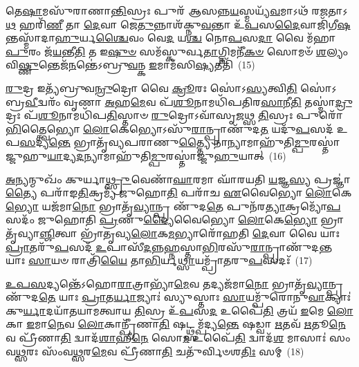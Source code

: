 {\anuvakamend[{𑌯𑍋 𑌵𑌾 𑌓𑌜᳴ 𑌆\-\ul{𑌹} 𑌯𑌦᳴\-\ul{𑌶𑍀}\-𑌯𑍇\-\ul{𑌤𑌿} 𑌤𑍇॑\-𑌽\-\ul{𑌗𑍍𑌨} 𑌏𑌕𑌾᳴\-𑌦𑌶 𑌚}]}%

𑌤𑍇\-\ul{𑌷𑌾}\-𑌮𑌸𑍁᳴𑌰𑌾𑌣𑌾\-\ul{𑌨𑍍𑌤𑌿}\-𑌸𑍍𑌰𑌃 𑌪𑍁𑌰᳴ 𑌆𑌸𑌨𑍍𑌨\-\ul{𑌯}\-𑌸𑍍𑌮𑌯𑍍𑌯᳴\-\ul{𑌵}\-𑌮𑌾\-𑌽𑌥᳴ 𑌰\-\ul{𑌜}\-𑌤𑌾\-𑌽\-\ul{𑌥} 𑌹𑌰𑌿᳴\-\ul{𑌣𑍀} 𑌤𑌾 \ul{𑌦𑍇}\-𑌵𑌾 𑌜𑍇\-\ul{𑌤𑍁}\-𑌨𑍍𑌨𑌾𑌶᳴𑌕𑍍𑌨𑍁\-\ul{𑌵}\-𑌨𑍍𑌤𑌾 𑌉᳴\-\ul{𑌪}\-𑌸\-\ul{𑌦𑍈}\-𑌵𑌾𑌜𑌿᳴𑌗𑍀\-\ul{𑌷}\-𑌨𑍍𑌤𑌸𑍍𑌮𑌾᳴𑌦𑌾\-\ul{𑌹𑍁}\-𑌰𑍍𑌯\-\ul{𑌶𑍍𑌚𑍈}\-𑌵𑌂 𑌵𑍇\-\ul{𑌦} 𑌯\-\ul{𑌶𑍍𑌚} 𑌨𑍋\-\ul{𑌪}\-𑌸\-\ul{𑌦𑌾} 𑌵𑍈 𑌮᳴𑌹𑌾\-\ul{𑌪𑍁}\-𑌰𑌂 𑌜᳴\-\ul{𑌯}\-𑌨𑍍𑌤𑍀\-\ul{𑌤𑌿} 𑌤 𑌇\-\ul{𑌷𑍁}\-\-\ul{𑍞} 𑌸𑌮᳴𑌸𑍍𑌕𑍁𑌰𑍍𑌵\-\ul{𑌤𑌾}\-𑌗𑍍𑌨𑌿𑌮𑌨𑍀᳴\-\ul{𑌕}\-\-\ul{𑍞} 𑌸𑍋𑌮𑍞᳴ \ul{𑌶}\-𑌲𑍍𑌯𑌂 𑌵𑌿\-\ul{𑌷𑍍𑌣𑍁}\-𑌨𑍍𑌤𑍇𑌜᳴\-\ul{𑌨}\-𑌨𑍍𑌤𑍇॑\-𑌽𑌬𑍍𑌰𑍁\-\ul{𑌵}\-𑌨𑍍𑌕 \ul{𑌇}\-𑌮𑌾𑌮᳴𑌸𑌿\-\ul{𑌷𑍍𑌯}\-𑌤𑍀𑌤𑌿᳴~(15)

\-\ul{𑌰𑍁}\-𑌦𑍍𑌰 𑌇𑌤𑍍𑌯᳴𑌬𑍍𑌰𑍁𑌵\-\ul{𑌨𑍍𑌰𑍁}\-𑌦𑍍𑌰𑍋 𑌵𑍈 \ul{𑌕𑍍𑌰𑍂}\-𑌰𑌃 𑌸𑍋॑\-𑌽\-\ul{𑌸𑍍𑌯}\-𑌤𑍍𑌵𑌿\-\ul{𑌤𑌿} 𑌸𑍋॑\-𑌽𑌬𑍍𑌰\-\ul{𑌵𑍀}\-𑌦𑍍𑌵𑌰𑌂᳴ 𑌵𑍃𑌣𑌾 \ul{𑌅}\-𑌹\-\ul{𑌮𑍇}\-𑌵 𑌪᳴\-\ul{𑌶𑍂}\-𑌨𑌾𑌮𑌧𑌿᳴𑌪𑌤𑌿𑌰\-\ul{𑌸𑌾}\-𑌨𑍀\-\ul{𑌤𑌿} 𑌤𑌸𑍍𑌮𑌾॑\-\ul{𑌦𑍍𑌰𑍁}\-𑌦𑍍𑌰𑌃 𑌪᳴\-\ul{𑌶𑍂}\-𑌨𑌾𑌮𑌧𑌿᳴𑌪\-\ul{𑌤𑌿}\-𑌸𑍍𑌤𑌾𑍞 \ul{𑌰𑍁}\-𑌦𑍍𑌰𑍋\-𑌽𑌵𑌾᳴𑌸𑍃\-\ul{𑌜}\-𑌥𑍍𑌸 \ul{𑌤𑌿}\-𑌸𑍍𑌰𑌃 𑌪𑍁𑌰𑍋᳴ \ul{𑌭𑌿}\-𑌤𑍍𑌤𑍍𑌵𑍈𑌭𑍍𑌯𑍋 \ul{𑌲𑍋}\-𑌕𑍇𑌭𑍍𑌯𑍋\-𑌽𑌸𑍁᳴\-\ul{𑌰𑌾}\-𑌨𑍍𑌪𑍍𑌰𑌾𑌣𑍁᳴𑌦\-\ul{𑌤} 𑌯𑌦𑍁᳴\-\ul{𑌪}\-𑌸𑌦᳴ 𑌉𑌪\-\ul{𑌸}\-𑌦𑍍𑌯\-\ul{𑌨𑍍𑌤𑍇} 𑌭𑍍𑌰𑌾𑌤𑍃᳴𑌵𑍍𑌯𑌪𑌰𑌾𑌣𑍁\-\ul{𑌤𑍍𑌤𑍍𑌯𑍈} 𑌨𑌾𑌨𑍍𑌯𑌾𑌮𑌾𑌹𑍁᳴𑌤𑌿\-\ul{𑌮𑍍𑌪𑍁}\-𑌰𑌸𑍍𑌤𑌾॑𑌜𑍍𑌜𑍁𑌹𑍁\-\ul{𑌯𑌾}\-𑌦𑍍𑌯\-\ul{𑌦}\-𑌨𑍍𑌯𑌾𑌮𑌾𑌹𑍁᳴𑌤𑌿\-\ul{𑌮𑍍𑌪𑍁}\-𑌰𑌸𑍍𑌤𑌾॑𑌜𑍍𑌜𑍁\-\ul{𑌹𑍁}\-𑌯𑌾𑌤𑍍~(16)

\-\ul{𑌅}\-𑌨𑍍𑌯𑌨𑍍𑌮𑍁𑌖𑌂᳴ 𑌕𑍁𑌰𑍍𑌯𑌾\-\ul{𑌥𑍍𑌸𑍍𑌰𑍁}\-𑌵𑍇𑌣𑌾᳴\-\ul{𑌘𑌾}\-𑌰𑌮𑌾 𑌘𑌾᳴𑌰𑌯𑌤𑌿 \ul{𑌯}\-𑌜𑍍𑌞\-\ul{𑌸𑍍𑌯} 𑌪𑍍𑌰𑌜𑍍𑌞𑌾॑\-\ul{𑌤𑍍𑌯𑍈} 𑌪𑌰𑌾᳴𑌙\-\ul{𑌤𑌿}\-𑌕𑍍𑌰𑌮𑍍𑌯᳴ 𑌜𑍁𑌹𑍋\-\ul{𑌤𑌿} 𑌪𑌰𑌾᳴𑌚 \ul{𑌏}\-𑌵𑍈𑌭𑍍𑌯𑍋 \ul{𑌲𑍋}\-𑌕𑍇\-\ul{𑌭𑍍𑌯𑍋} 𑌯𑌜᳴𑌮𑌾\-\ul{𑌨𑍋} 𑌭𑍍𑌰𑌾𑌤𑍃᳴\-\ul{𑌵𑍍𑌯𑌾}\-𑌨𑍍𑌪𑍍𑌰 𑌣𑍁᳴𑌦\-\ul{𑌤𑍇} 𑌪𑍁𑌨᳴𑌰\-\ul{𑌤𑍍𑌯𑌾}\-𑌕𑍍𑌰𑌮𑍍𑌯𑍋᳴\-\ul{𑌪}\-𑌸𑌦𑌂᳴ 𑌜𑍁𑌹𑍋𑌤𑌿 \ul{𑌪𑍍𑌰}\-𑌣𑍁\-\ul{𑌦𑍍𑌯𑍈}\-𑌵𑍈𑌭𑍍𑌯𑍋 \ul{𑌲𑍋}\-𑌕𑍇\-\ul{𑌭𑍍𑌯𑍋} 𑌭𑍍𑌰𑌾𑌤𑍃᳴𑌵𑍍𑌯𑌾\-\ul{𑌞𑍍𑌜𑌿}\-𑌤𑍍𑌵𑌾 𑌭𑍍𑌰𑌾᳴𑌤𑍃𑌵𑍍𑌯\-\ul{𑌲𑍋}\-𑌕\-\ul{𑌮}\-𑌭𑍍𑌯𑌾𑌰𑍋᳴𑌹𑌤𑌿 \ul{𑌦𑍇}\-𑌵𑌾 𑌵𑍈 𑌯𑌾𑌃 \ul{𑌪𑍍𑌰𑌾}\-𑌤𑌰𑍁᳴\-\ul{𑌪}\-𑌸𑌦᳴ \ul{𑌉}\-𑌪𑌾𑌸𑍀᳴\-\ul{𑌦}\-𑌨𑍍𑌨\-\ul{𑌹𑍍𑌨}\-𑌸𑍍𑌤𑌾\-\ul{𑌭𑌿}\-𑌰𑌸𑍁᳴\-\ul{𑌰𑌾}\-𑌨𑍍𑌪𑍍𑌰𑌾𑌣𑍁᳴𑌦\-\ul{𑌨𑍍𑌤} 𑌯𑌾𑌃 \ul{𑌸𑌾}\-𑌯𑍞 𑌰𑌾𑌤𑍍𑌰𑌿᳴\-\ul{𑌯𑍈} 𑌤𑌾\-\ul{𑌭𑌿}\-𑌰𑍍𑌯\-\ul{𑌥𑍍𑌸𑌾}\-𑌯𑌮𑍍𑌪𑍍𑌰𑌾᳴𑌤𑌰𑍁\-\ul{𑌪}\-𑌸𑌦𑌃᳴~(17)

\-\ul{𑌉}\-\-\ul{𑌪}\-\-\ul{𑌸}\-𑌦𑍍𑌯𑌨𑍍𑌤𑍇᳴\-𑌽𑌹𑍋\-\ul{𑌰𑌾}\-𑌤𑍍𑌰𑌾𑌭𑍍𑌯𑌾᳴\-\ul{𑌮𑍇}\-𑌵 𑌤𑌦𑍍𑌯𑌜᳴𑌮𑌾\-\ul{𑌨𑍋} 𑌭𑍍𑌰𑌾𑌤𑍃᳴\-\ul{𑌵𑍍𑌯𑌾}\-𑌨𑍍𑌪𑍍𑌰 𑌣𑍁᳴𑌦\-\ul{𑌤𑍇} 𑌯𑌾𑌃 \ul{𑌪𑍍𑌰𑌾}\-𑌤\-\ul{𑌰𑍍𑌯𑌾}\-𑌜𑍍𑌯𑌾𑌃॑ 𑌸𑍍𑌯𑍁𑌸𑍍𑌤𑌾𑌃 \ul{𑌸𑌾}\-𑌯𑌮𑍍𑌪𑍁᳴𑌰𑍋𑌨𑍁\-\ul{𑌵𑌾}\-𑌕𑍍𑌯𑌾𑌃॑ 𑌕𑍁\-\ul{𑌰𑍍𑌯𑌾}\-𑌦𑌯𑌾᳴𑌤𑌯𑌾𑌮𑌤𑍍𑌵𑌾𑌯 \ul{𑌤𑌿}\-𑌸𑍍𑌰 𑌉᳴\-\ul{𑌪}\-𑌸\-\ul{𑌦} 𑌉𑌪𑍈᳴\-\ul{𑌤𑌿} 𑌤𑍍𑌰𑌯᳴ \ul{𑌇}\-𑌮𑍇 \ul{𑌲𑍋}\-𑌕𑌾 \ul{𑌇}\-𑌮𑌾\-\ul{𑌨𑍇}\-𑌵 \ul{𑌲𑍋}\-𑌕𑌾𑌨𑍍𑌪𑍍𑌰𑍀᳴𑌣𑌾\-\ul{𑌤𑌿} 𑌷𑌟𑍍𑌥𑍍𑌸𑌮𑍍𑌪᳴𑌦𑍍𑌯\-\ul{𑌨𑍍𑌤𑍇} 𑌷𑌡𑍍𑌵𑌾 \ul{𑌋}\-𑌤𑌵᳴ \ul{𑌋}\-𑌤𑍂\-\ul{𑌨𑍇}\-𑌵 𑌪𑍍𑌰𑍀᳴𑌣𑌾\-\ul{𑌤𑌿} 𑌦𑍍𑌵𑌾𑌦᳴\-\ul{𑌶𑌾}\-𑌹𑍀\-\ul{𑌨𑍇} 𑌸𑍋\-\ul{𑌮} 𑌉𑌪𑍈᳴\-\ul{𑌤𑌿} 𑌦𑍍𑌵𑌾𑌦᳴\-\ul{𑌶} 𑌮𑌾𑌸𑌾𑌃॑ 𑌸𑌂𑌵\-\ul{𑌥𑍍𑌸}\-𑌰𑌃 𑌸𑌂᳴𑌵\-\ul{𑌥𑍍𑌸}\-𑌰\-\ul{𑌮𑍇}\-𑌵 𑌪𑍍𑌰𑍀᳴𑌣𑌾\-\ul{𑌤𑌿} 𑌚𑌤𑍁᳴𑌰𑍍𑌵𑌿𑍞𑌶\-\ul{𑌤𑌿𑌃} 𑌸𑌮𑍍~(18)

